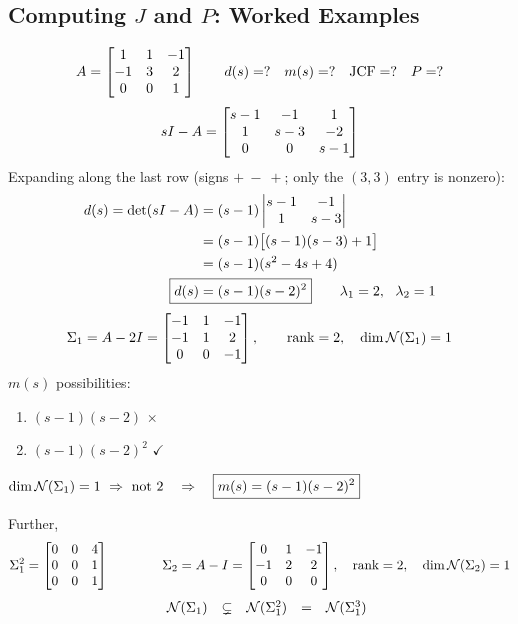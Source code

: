 \subsection{Computing \texorpdfstring{$J$}{J} and \texorpdfstring{$P$}{P}: Worked Examples}\label{ss:jordan-examples}
\begin{example}
\[
A=\begin{bmatrix}1&1&-1\\-1&3&2\\0&0&1\end{bmatrix}
\qquad d(s)=?\quad m(s)=?\quad \text{JCF}=?\quad P=?
\]
\[
sI-A=\begin{bmatrix}s-1&-1&1\\1&s-3&-2\\0&0&s-1\end{bmatrix}
\]
Expanding along the last row (signs $+\ -\ +$; only the $(3,3)$ entry is nonzero):
\begin{align*}
d(s)=\det(sI-A)&=(s-1)\begin{vmatrix}s-1&-1\\1&s-3\end{vmatrix}\\
&=(s-1)\big[(s-1)(s-3)+1\big]\\
&=(s-1)(s^2-4s+4)\\
\Aboxed{d(s)&=(s-1)(s-2)^2} \qquad \lambda_1=2,\ \ \lambda_2=1
\end{align*}
\[
\Sigma_1=A-2I=\begin{bmatrix}-1&1&-1\\-1&1&2\\0&0&-1\end{bmatrix},\qquad \operatorname{rank}=2,\quad \dim\mathcal{N}(\Sigma_1)=1
\]
$m(s)$ possibilities:
\begin{enumerate}[label=\arabic*),nosep]
\item $(s-1)(s-2)$ \quad $\times$
\item $(s-1)(s-2)^2$ \quad $\checkmark$
\end{enumerate}
\begin{center}
$\dim\Null(\Sigma_1)=1\ \Rightarrow\ \text{not }2\quad\Rightarrow\quad
\boxed{m(s)=(s-1)(s-2)^2}$
\end{center}
Further,
\[
\Sigma_1^2=\begin{bmatrix}0&0&4\\0&0&1\\0&0&1\end{bmatrix}
\qquad\qquad
\Sigma_2=A-I=\begin{bmatrix}0&1&-1\\-1&2&2\\0&0&0\end{bmatrix},\quad \operatorname{rank}=2,\quad \dim\mathcal{N}(\Sigma_2)=1
\]
\[
\begin{array}{r@{\quad}ccccc}
 & \Null(\Sigma_1) & \subsetneq & \Null(\Sigma_1^2) & = & \Null(\Sigma_1^3)\\

\end{array}\]
\end{example}
